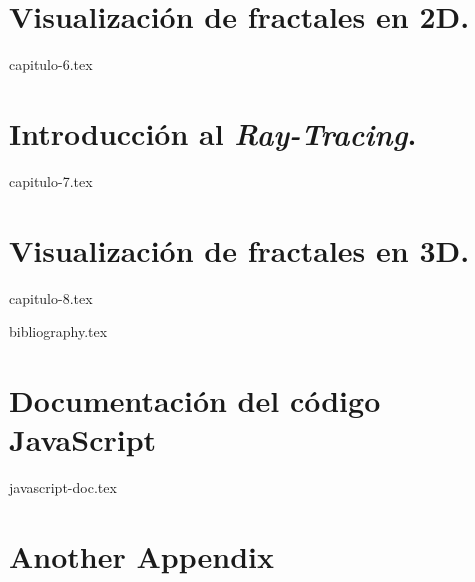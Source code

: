 \documentclass[11pt]{report}
\begin{document}
\chapter{Visualización de fractales en 2D.}
\label{chap:fractales-2D}

{capitulo-6.tex}

\chapter{Introducción al \textit{Ray-Tracing}.}
\label{chap:ray-tracing}

{capitulo-7.tex}

\chapter{Visualización de fractales en 3D.}
\label{chap:fractales-3D}

{capitulo-8.tex}


{bibliography.tex}



\appendix
\cleardoublepage


\chapter{Documentación del código JavaScript}
\label{appendix:javascript}

{javascript-doc.tex}


\chapter{Another Appendix}
\end{document}

